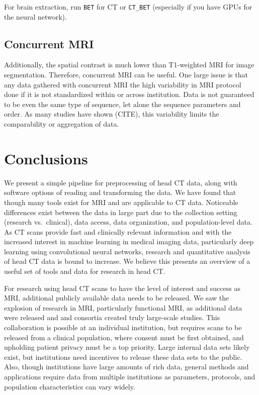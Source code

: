 \documentclass[]{elsarticle} %
\begin{document}
For brain extraction, run \texttt{BET} for CT or \texttt{CT\_BET} (especially if you have GPUs for the neural network).

\hypertarget{concurrent-mri}{%
\subsection{Concurrent MRI}\label{concurrent-mri}}

Additionally, the spatial contrast is much lower than T1-weighted MRI for image segmentation. Therefore, concurrent MRI can be useful. One large issue is that any data gathered with concurrent MRI the high variability in MRI protocol done if it is not standardized within or across institution. Data is not guaranteed to be even the same type of sequence, let alone the sequence parameters and order. As many studies have shown (CITE), this variability limits the comparability or aggregation of data.

\hypertarget{conclusions}{%
\section{Conclusions}\label{conclusions}}

We present a simple pipeline for preprocessing of head CT data, along with software options of reading and transforming the data. We have found that though many tools exist for MRI and are applicable to CT data. Noticeable differences exist between the data in large part due to the collection setting (research vs.~clinical), data access, data organization, and population-level data. As CT scans provide fast and clinically relevant information and with the increased interest in machine learning in medical imaging data, particularly deep learning using convolutional neural networks, research and quantitative analysis of head CT data is bound to increase. We believe this presents an overview of a useful set of tools and data for research in head CT.

For research using head CT scans to have the level of interest and success as MRI, additional publicly available data needs to be released. We saw the explosion of research in MRI, particularly functional MRI, as additional data were released and and consortia created truly large-scale studies. This collaboration is possible at an individual institution, but requires scans to be released from a clinical population, where consent must be first obtained, and upholding patient privacy must be a top priority. Large internal data sets likely exist, but institutions need incentives to release these data sets to the public. Also, though institutions have large amounts of rich data, general methods and applications require data from multiple institutions as parameters, protocols, and population characteristics can vary widely.
\end{document}
